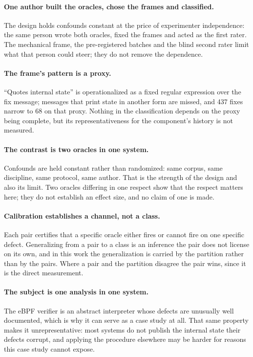 \paragraph{One author built the oracles, chose the frames and classified.}
The design holds confounds constant at the price of experimenter independence: the
same person wrote both oracles, fixed the frames and acted as the first rater. The
mechanical frame, the pre-registered batches and the blind second rater limit what
that person could steer; they do not remove the dependence.

\paragraph{The frame's pattern is a proxy.}
``Quotes internal state'' is operationalized as a fixed regular expression over the
fix message; messages that print state in another form are missed, and 437 fixes
narrow to 68 on that proxy. Nothing in the classification depends on the proxy being
complete, but its representativeness for the component's history is not measured.

\paragraph{The contrast is two oracles in one system.}
Confounds are held constant rather than randomized: same corpus, same discipline,
same protocol, same author. That is the strength of the design and also its limit.
Two oracles differing in one respect show that the respect matters here; they do not
establish an effect size, and no claim of one is made.

\paragraph{Calibration establishes a channel, not a class.}
Each pair certifies that a specific oracle either fires or cannot fire on one
specific defect. Generalizing from a pair to a class is an inference the pair does
not license on its own, and in this work the generalization is carried by the
partition rather than by the pairs. Where a pair and the partition disagree the pair
wins, since it is the direct measurement.

\paragraph{The subject is one analysis in one system.}
The eBPF verifier is an abstract interpreter whose defects are unusually well
documented, which is why it can serve as a case study at all. That same property
makes it unrepresentative: most systems do not publish the internal state their
defects corrupt, and applying the procedure elsewhere may be harder for reasons this
case study cannot expose.
